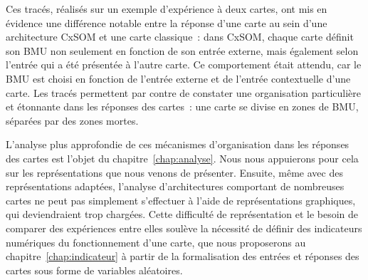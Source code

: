 \documentclass[../main]{subfiles}
\begin{document}
Ces tracés, réalisés sur un exemple d'expérience à deux cartes, ont mis en évidence une différence notable entre la réponse d'une carte au sein d'une architecture CxSOM et une carte classique~: dans CxSOM, chaque carte définit son BMU non seulement en fonction de son entrée externe, mais également selon l'entrée qui a été présentée à l'autre carte. Ce comportement était attendu, car le BMU est choisi en fonction de l'entrée externe et de l'entrée contextuelle d'une carte. Les tracés permettent par contre de constater une organisation particulière et étonnante dans les réponses des cartes~: une carte se divise en zones de BMU, séparées par des zones mortes.

L'analyse plus approfondie de ces mécanismes d'organisation dans les réponses des cartes est l'objet du chapitre~\ref{chap:analyse}. Nous nous appuierons pour cela sur les représentations que nous venons de présenter.
Ensuite, même avec des représentations adaptées, l'analyse d'architectures comportant de nombreuses cartes ne peut pas simplement s'effectuer à l'aide de représentations graphiques, qui deviendraient trop chargées. 
Cette difficulté de représentation et le besoin de comparer des expériences entre elles soulève la nécessité de définir des indicateurs numériques du fonctionnement d'une carte, que nous proposerons au chapitre~\ref{chap:indicateur} à partir de la formalisation des entrées et réponses des cartes sous forme de variables aléatoires.

\ifSubfilesClassLoaded{
    \printbibliography
}{}
\end{document}
